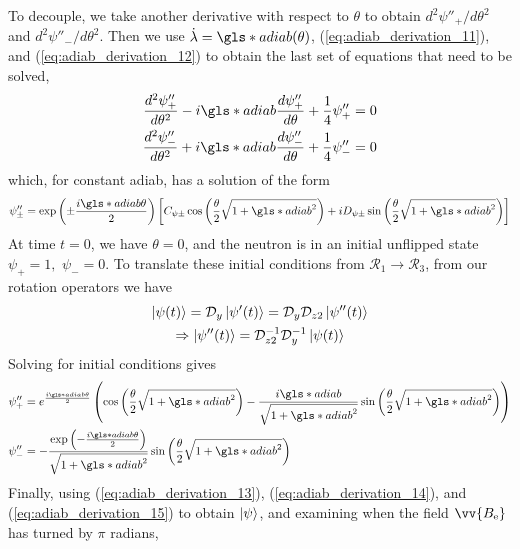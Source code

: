 %
To decouple, we take another derivative with respect to $\theta$ to obtain $d^2\psi''_{+}/d\theta^2$ and $d^2\psi''_{-}/d\theta^2$. Then we use $\dot{\lambda}=\gls*{adiab}(\theta)$, (\ref{eq:adiab_derivation_11}), and (\ref{eq:adiab_derivation_12}) to obtain the last set of equations that need to be solved,
%
\begin{align}
\frac{d^{2}\psi''_{+}}{d\theta^{2}}-i\gls*{adiab}\frac{d\psi''_{+}}{d\theta}+\frac{1}{4}\psi''_{+} & =0\\
\frac{d^{2}\psi''_{-}}{d\theta^{2}}+i\gls*{adiab}\frac{d\psi''_{-}}{d\theta}+\frac{1}{4}\psi''_{-} & =0
\end{align}
%
which, for constant \gls{adiab}, has a solution of the form
%
\begin{gather}
    \psi''_\pm=\exp\left( \pm \frac{i\gls*{adiab}\theta}{2} \right)
                \left[C_{\psi\pm}\cos \left(\frac{\theta}{2}\sqrt{1+\gls*{adiab}^2} \right)  
                + i D_{\psi\pm}\sin \left(\frac{\theta}{2}\sqrt{1+\gls*{adiab}^2} \right)
                \right]
\end{gather}
%
At time $t=0$, we have $\theta=0$, and the neutron is in an initial unflipped state $\psi_+=1,\,\,\psi_-=0$. To translate these initial conditions from $\mathcal{{R}}_{1}\rightarrow\mathcal{{R}}_{3}$, from our rotation operators we have
%
\begin{gather}   
    \Ket{\psi(t)}=\mathcal{{D}}_{y}\Ket{\psi'(t)}=\mathcal{{D}}_{y}\mathcal{{D}}_{z2}\Ket{\psi''(t)} \\
    \Rightarrow\Ket{\psi''(t)}=\mathcal{{D}}_{z2}^{-1}\mathcal{{D}}_{y}^{-1}\Ket{\psi(t)}
    \label{eq:adiab_derivation_13}
\end{gather}
%
Solving for initial conditions gives
%
\begin{align}
    \psi''_{+} &= e^{\frac{i\gls*{adiab}\theta}{2}}\left(\cos\left(\frac{\theta}{2}\sqrt{1+\gls*{adiab}^{2}}\right)-\frac{i\gls*{adiab}}{\sqrt{1+\gls*{adiab}^{2}}}\sin\left(\frac{\theta}{2}\sqrt{1+\gls*{adiab}^{2}}\right)\right) 
    \label{eq:adiab_derivation_14}\\
    \psi''_{-} &= -\frac{\exp\left(-\frac{i\gls*{adiab}\theta}{2}\right)}{\sqrt{1+\gls*{adiab}^{2}}}\sin\left(\frac{\theta}{2}\sqrt{1+\gls*{adiab}^{2}}\right)
    \label{eq:adiab_derivation_15}
\end{align}
%
Finally, using (\ref{eq:adiab_derivation_13}), (\ref{eq:adiab_derivation_14}), and (\ref{eq:adiab_derivation_15}) to obtain $\Ket{\psi}$, and examining when the field $\vv{B_\text{e}}$ has turned by $\pi$ radians,
